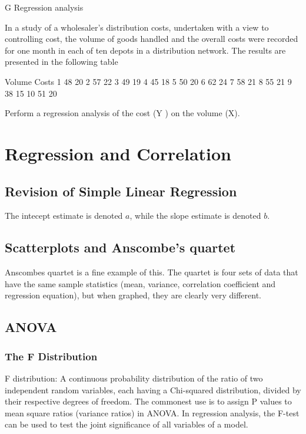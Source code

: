 G   Regression analysis
 
In a study of a wholesaler’s distribution costs, undertaken with a view to controlling cost, the volume of goods handled and the overall costs were recorded for one month in each of ten depots in a distribution network. The results are presented in the following table


       Volume      Costs
1         48         20
2         57         22
3         49         19
4         45         18
5         50         20
6         62         24
7         58         21
8         55         21
9         38         15
10        51        20
 
Perform a regression analysis of the cost (Y ) on the volume (X).


\newpage
\chapter{Regression and Correlation}
\section{Revision of Simple Linear Regression}

The intecept estimate is denoted $a$, while the slope estimate is denoted $b$.


\section{Scatterplots and Anscombe's quartet}
Anscombes quartet is a fine example of this. The quartet is four sets of data that have the same sample statistics (mean, variance, correlation coefficient and regression equation), but when graphed, they are clearly very different.

\newpage

\newpage
\section{ANOVA}
\subsection{The F Distribution}
F distribution: A continuous probability distribution of the ratio of two independent random variables, each having a Chi-squared distribution, divided by their respective degrees of freedom. The commonest use is to assign P values to mean square ratios (variance ratios) in ANOVA. In regression analysis, the F-test can be used to test the joint significance of all variables of a model.


